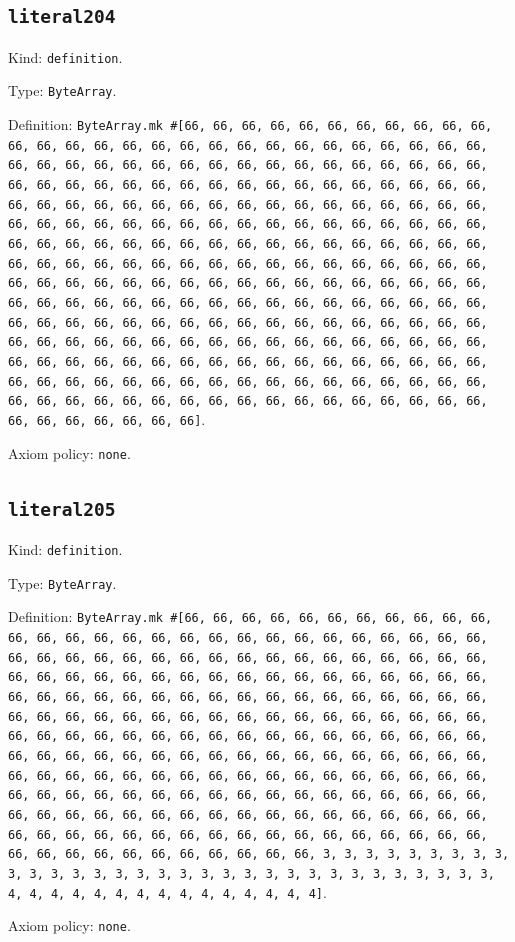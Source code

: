 \documentclass[11pt]{article}
\begin{document}
\subsection*{\texttt{literal204}}
\noindent Kind: \texttt{definition}.\par
\noindent Type: \texttt{ByteArray}.\par
\noindent Definition: \texttt{ByteArray.mk \#[66, 66, 66, 66, 66, 66, 66, 66, 66, 66, 66, 66, 66, 66, 66, 66, 66, 66, 66, 66, 66, 66, 66, 66, 66, 66, 66, 66, 66, 66, 66, 66, 66, 66, 66, 66, 66, 66, 66, 66, 66, 66, 66, 66, 66, 66, 66, 66, 66, 66, 66, 66, 66, 66, 66, 66, 66, 66, 66, 66, 66, 66, 66, 66, 66, 66, 66, 66, 66, 66, 66, 66, 66, 66, 66, 66, 66, 66, 66, 66, 66, 66, 66, 66, 66, 66, 66, 66, 66, 66, 66, 66, 66, 66, 66, 66, 66, 66, 66, 66, 66, 66, 66, 66, 66, 66, 66, 66, 66, 66, 66, 66, 66, 66, 66, 66, 66, 66, 66, 66, 66, 66, 66, 66, 66, 66, 66, 66, 66, 66, 66, 66, 66, 66, 66, 66, 66, 66, 66, 66, 66, 66, 66, 66, 66, 66, 66, 66, 66, 66, 66, 66, 66, 66, 66, 66, 66, 66, 66, 66, 66, 66, 66, 66, 66, 66, 66, 66, 66, 66, 66, 66, 66, 66, 66, 66, 66, 66, 66, 66, 66, 66, 66, 66, 66, 66, 66, 66, 66, 66, 66, 66, 66, 66, 66, 66, 66, 66, 66, 66, 66, 66, 66, 66, 66, 66, 66, 66, 66, 66, 66, 66, 66, 66, 66, 66, 66, 66, 66, 66, 66, 66, 66, 66, 66, 66, 66, 66, 66, 66, 66, 66, 66, 66, 66, 66, 66, 66, 66, 66, 66, 66, 66, 66, 66, 66, 66, 66, 66, 66, 66, 66, 66, 66, 66, 66]}.\par
\noindent Axiom policy: \texttt{none}.\par
\subsection*{\texttt{literal205}}
\noindent Kind: \texttt{definition}.\par
\noindent Type: \texttt{ByteArray}.\par
\noindent Definition: \texttt{ByteArray.mk \#[66, 66, 66, 66, 66, 66, 66, 66, 66, 66, 66, 66, 66, 66, 66, 66, 66, 66, 66, 66, 66, 66, 66, 66, 66, 66, 66, 66, 66, 66, 66, 66, 66, 66, 66, 66, 66, 66, 66, 66, 66, 66, 66, 66, 66, 66, 66, 66, 66, 66, 66, 66, 66, 66, 66, 66, 66, 66, 66, 66, 66, 66, 66, 66, 66, 66, 66, 66, 66, 66, 66, 66, 66, 66, 66, 66, 66, 66, 66, 66, 66, 66, 66, 66, 66, 66, 66, 66, 66, 66, 66, 66, 66, 66, 66, 66, 66, 66, 66, 66, 66, 66, 66, 66, 66, 66, 66, 66, 66, 66, 66, 66, 66, 66, 66, 66, 66, 66, 66, 66, 66, 66, 66, 66, 66, 66, 66, 66, 66, 66, 66, 66, 66, 66, 66, 66, 66, 66, 66, 66, 66, 66, 66, 66, 66, 66, 66, 66, 66, 66, 66, 66, 66, 66, 66, 66, 66, 66, 66, 66, 66, 66, 66, 66, 66, 66, 66, 66, 66, 66, 66, 66, 66, 66, 66, 66, 66, 66, 66, 66, 66, 66, 66, 66, 66, 66, 66, 66, 66, 66, 66, 66, 66, 66, 66, 66, 66, 66, 66, 66, 66, 66, 66, 66, 66, 66, 66, 66, 66, 3, 3, 3, 3, 3, 3, 3, 3, 3, 3, 3, 3, 3, 3, 3, 3, 3, 3, 3, 3, 3, 3, 3, 3, 3, 3, 3, 3, 3, 3, 3, 3, 4, 4, 4, 4, 4, 4, 4, 4, 4, 4, 4, 4, 4, 4, 4]}.\par
\noindent Axiom policy: \texttt{none}.\par
\end{document}
